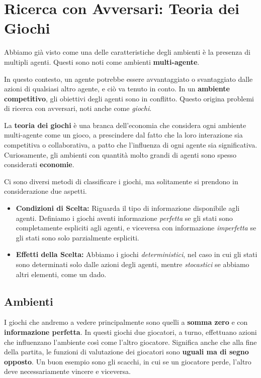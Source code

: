 \newpage
\section{Ricerca con Avversari: Teoria dei Giochi}
    Abbiamo già visto come una delle caratteristiche degli ambienti è la presenza di multipli agenti. Questi sono noti come ambienti \textbf{multi-agente}.
    
    In questo contesto, un agente potrebbe essere avvantaggiato o svantaggiato dalle azioni di qualsiasi altro agente, e ciò va tenuto in conto. In un \textbf{ambiente competitivo}, gli obiettivi degli agenti sono in conflitto. Questo origina problemi di ricerca con avversari, noti anche come \textit{giochi}.
    
    La \textbf{teoria dei giochi} è una branca dell'economia che considera ogni ambiente multi-agente come un gioco, a prescindere dal fatto che la loro interazione sia competitiva o collaborativa, a patto che l'influenza di ogni agente sia significativa. Curiosamente, gli ambienti con quantità molto grandi di agenti sono spesso considerati \textbf{economie}.
        
    Ci sono diversi metodi di classificare i giochi, ma solitamente si prendono in considerazione due aspetti.
    \begin{itemize}
        \item \textbf{Condizioni di Scelta:} Riguarda il tipo di informazione disponibile agli agenti. Definiamo i giochi aventi informazione \textit{perfetta} se gli stati sono completamente espliciti agli agenti, e viceversa con informazione \textit{imperfetta} se gli stati sono solo parzialmente espliciti.
            
        \item \textbf{Effetti della Scelta:} Abbiamo i giochi \textit{deterministici}, nel caso in cui gli stati sono determinati solo dalle azioni degli agenti, mentre \textit{stocastici} se abbiamo altri elementi, come un dado.
        \end{itemize}
        
    \subsection{Ambienti}
        I giochi che andremo a vedere principalmente sono quelli a \textbf{somma zero} e con \textbf{informazione perfetta}. In questi giochi due giocatori, a turno, effettuano azioni che influenzano l'ambiente così come l'altro giocatore. Significa anche che alla fine della partita, le funzioni di valutazione dei giocatori sono \textbf{uguali ma di segno opposto}. Un buon esempio sono gli scacchi, in cui se un giocatore perde, l'altro deve necessariamente vincere e viceversa.
            
